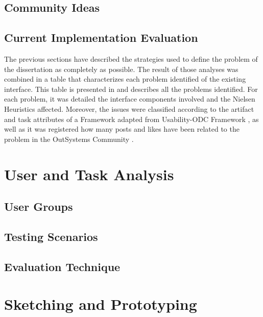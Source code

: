 \subsection{Community Ideas}
\label{subsec:community_ideas}

\subsection{Current Implementation Evaluation}
\label{sec:current_implementation_evaluation}


The previous sections have described the strategies used to define the problem of the dissertation as completely as possible. The result of those analyses was combined in a table that characterizes each problem identified of the existing interface. This table is presented in  and describes all the problems identified. For each problem, it was detailed the interface components involved and the Nielsen Heuristics \cite{nielsen_heuristics} affected. Moreover, the issues were classified according to the artifact and task attributes of a Framework adapted from Usability-ODC Framework \cite{in_process_usability_problem_classification_analysis_improvement}, as well as it was registered how many posts and likes have been related to the problem in the OutSystems Community \cite{outsystems_community}.

\section{User and Task Analysis}
\label{sec:user_and_task_analysis}

\subsection{User Groups}
\label{subsec:user_groups}

\subsection{Testing Scenarios}
\label{subsec:testing_scenarios}

\subsection{Evaluation Technique}
\label{subsec:evaluation_technique}

\section{Sketching and Prototyping}
\label{sec:sketching_and_prototyping}

